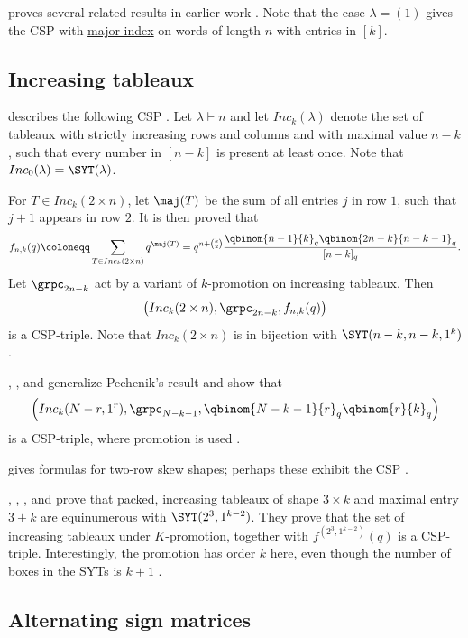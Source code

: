  proves several related results in earlier work
\cite{Uhlin2019}.
Note that the case $\lambda = (1)$ gives the
CSP with \hyperref[majorIndex]{major index} on words of length $n$ with
entries in $[k]$.



\subsection[cspIncreasingTableau]{Increasing tableaux}

 describes the following CSP \cite{Pechenik2014}.
Let $\lambda\vdash n$ and let $Inc_k(\lambda)$ denote the set of
tableaux with strictly increasing rows and columns and with maximal value $n-k$,
such that every number in $[n-k]$ is present at least once.
Note that $Inc_0(\lambda) = \SYT(\lambda)$.

For $T \in Inc_k(2\times n)$, let $\maj(T)$ be the sum of all entries $j$ in row $1$,
such that $j+1$ appears in row $2$.
It is then proved that
\[
f_{n,k}(q) \coloneqq \sum_{T \in Inc_k(2\times n)} q^{\maj(T)} =
q^{n+\binom{k}{2}} \frac{\qbinom{n-1}{k}_q \qbinom{2n-k}{n-k-1}_q }{[n-k]_q}.
\]
Let $\grpc_{2n-k}$ act by a variant of $k$-promotion on increasing tableaux.
Then
\[
\left( Inc_k(2\times n), \grpc_{2n-k}, f_{n,k}(q) \right)
\]
is a CSP-triple.  Note that $Inc_k(2\times n)$ is in bijection with
$\SYT(n-k,n-k,1^k)$.


, , and 
generalize Pechenik's result and show that
\[
\left( Inc_k(N-r,1^r), \grpc_{N-k-1}, \qbinom{N-k-1}{r}_q \qbinom{r}{k}_q \right)
\]
is a CSP-triple, where promotion is used \cite{PresseyStokkeVisentin2016}.


 gives formulas for two-row skew shapes; perhaps these
exhibit the CSP \cite{Chen2020}.



, , , and
 prove that packed, increasing tableaux of shape
$3 \times k$ and maximal entry $3+k$ are equinumerous with
$\SYT(2^3,1^{k-2})$.  They prove that the set of increasing tableaux under
$K$-promotion,
together with $f^{(2^3,1^{k-2})}(q)$ is a CSP-triple.
Interestingly, the promotion has order $k$ here, even though
the number of boxes in the SYTs is $k+1$
\cite{GaetzPechenikStrikerSwanson2021x}.



\subsection[cspASM]{Alternating sign matrices}

